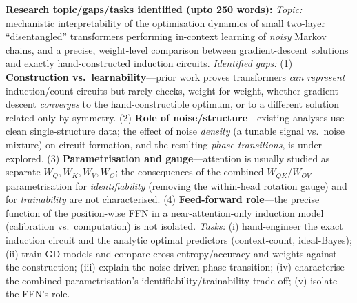 \documentclass[12pt]{article}
\begin{document}
\medskip
\noindent\textbf{Research topic/gaps/tasks identified (upto 250 words):}
\emph{Topic:} mechanistic interpretability of the optimisation dynamics of small two-layer
``disentangled'' transformers performing in-context learning of \emph{noisy} Markov chains, and a
precise, weight-level comparison between gradient-descent solutions and exactly hand-constructed
induction circuits. \emph{Identified gaps:} (1) \textbf{Construction vs.\ learnability}---prior
work proves transformers \emph{can represent} induction/count circuits but rarely checks, weight
for weight, whether gradient descent \emph{converges} to the hand-constructible optimum, or to a
different solution related only by symmetry. (2) \textbf{Role of noise/structure}---existing
analyses use clean single-structure data; the effect of noise \emph{density} (a tunable signal
vs.\ noise mixture) on circuit formation, and the resulting \emph{phase transitions}, is
under-explored. (3) \textbf{Parametrisation and gauge}---attention is usually studied as separate
$W_Q,W_K,W_V,W_O$; the consequences of the combined $W_{QK}/W_{OV}$ parametrisation for
\emph{identifiability} (removing the within-head rotation gauge) and for \emph{trainability} are
not characterised. (4) \textbf{Feed-forward role}---the precise function of the position-wise FFN
in a near-attention-only induction model (calibration vs.\ computation) is not isolated.
\emph{Tasks:} (i) hand-engineer the exact induction circuit and the analytic optimal predictors
(context-count, ideal-Bayes); (ii) train GD models and compare cross-entropy/accuracy and weights
against the construction; (iii) explain the noise-driven phase transition; (iv) characterise the
combined parametrisation's identifiability/trainability trade-off; (v) isolate the FFN's role.
\end{document}
